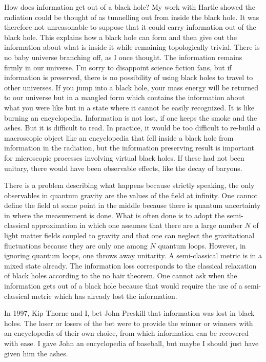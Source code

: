 \documentclass[aps,prd,groupedaddress,showpacs,12pt,nofootinbib]{revtex4-1}
\begin{document}
How does information get out of a black hole? My work with Hartle \cite{HartleHawking} showed the radiation could be thought of as tunnelling out from inside the black hole. It was therefore not unreasonable to suppose that it could carry information out of the black hole.  This explains how a black hole can form and then give out the information about what is inside it while remaining topologically trivial. There is no baby universe branching off, as I once thought. The information remains firmly in our universe. I'm sorry to disappoint science fiction fans, but if information is preserved, there is no possibility of using black holes to travel to other universes. If you jump into a black hole, your mass energy will be returned to our universe but in a mangled form which contains the information about what you were like but in a  state where it cannot be easily recognized.  It is like burning an encyclopedia. Information is not lost, if one keeps the smoke and the ashes. But it is difficult to read. In practice, it would be too difficult to re-build a macroscopic object like an encyclopedia that fell inside a black hole from information in the radiation, but the information preserving result is important for microscopic processes involving virtual black holes. If these had not been unitary, there would have been observable effects, like the decay of baryons. 



There is a problem describing what happens because strictly speaking, the only observables in quantum gravity are the values of the field at infinity. One cannot define the field at some point in the middle because there is quantum uncertainty in where the measurement is done. What is often done is to adopt the semi-classical approximation in which one assumes that there are a large number $N$ of light matter fields coupled to gravity and that one can neglect the gravitational fluctuations because they are only one among $N$ quantum loops. However, in ignoring quantum loops, one throws away unitarity. A semi-classical metric is in a mixed state already. The information loss corresponds to the classical relaxation of black holes according to the no hair theorem. One cannot ask when the information gets out of a black hole because that would require the use of a semi-classical metric which has already lost the information. 

  

In 1997, Kip Thorne and I,  bet John Preskill that information was lost in black holes. The loser or losers of the bet  were to provide the winner or winners with an encyclopedia of their own choice, from which information can be recovered with ease. I gave John an encyclopedia of baseball, but maybe I should just have given him the ashes.
\end{document}
